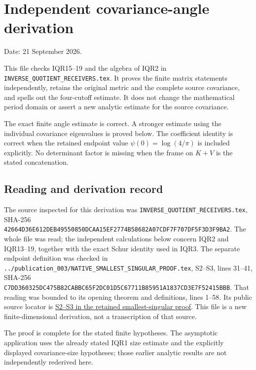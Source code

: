 \section{Independent covariance-angle derivation}\label{independent-covariance-angle-derivation}

Date: 21 September 2026.

This file checks IQR15--19 and the algebra of IQR2 in \nolinkurl{INVERSE_QUOTIENT_RECEIVERS.tex}. It proves the finite matrix statements independently, retains the original metric and the complete source covariance, and spells out the four-cutoff estimate. It does not change the mathematical period domain or assert a new analytic estimate for the source covariance.

The exact finite angle estimate is correct. A stronger estimate using the individual covariance eigenvalues is proved below. The coefficient identity is correct when the retained endpoint value \(\psi(0)=\log(4/\pi)\) is included explicitly. No determinant factor is missing when the frame on \(K+V\) is the stated concatenation.

\subsection{Reading and derivation record}\label{reading-and-derivation-record}

The source inspected for this derivation was \nolinkurl{INVERSE_QUOTIENT_RECEIVERS.tex}, SHA-256 \nolinkurl{42664D36E612DEB49550850DCAA15EF2774B58682A07CDF7F707DF5F3D3F9BA2}. The whole file was read; the independent calculations below concern IQR2 and IQR13--19, together with the exact Schur identity used in IQR3. The separate endpoint definition was checked in \nolinkurl{../publication_003/NATIVE_SMALLEST_SINGULAR_PROOF.tex}, S2--S3, lines 31--41, SHA-256 \nolinkurl{C7DD360325DC475B82CABBC65F2DC01D5C67711B85951A1837CD3E7F52415BBB}. That reading was bounded to its opening theorem and definitions, lines 1--58. Its public source locator is \href{https://github.com/KokunoYumeto/zeta-function-research-reader/blob/0fd693c844aad9117e30ec447c59864a28af10f3/workbenches/splitzero-tandem/continuations/20260921-native-spectral-real-pair/003/NATIVE_SMALLEST_SINGULAR_PROOF.tex\#L31}{S2--S3 in the retained smallest-singular proof}. This file is a new finite-dimensional derivation, not a transcription of that source.

The proof is complete for the stated finite hypotheses. The asymptotic application uses the already stated IQR1 size estimate and the explicitly displayed covariance-size hypotheses; those earlier analytic results are not independently rederived here.

